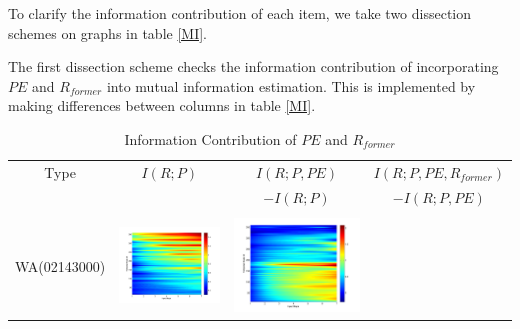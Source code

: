 \documentclass[11pt]{article}
\begin{document}
To clarify the information contribution of each item, 
we take two dissection schemes on graphs in table \ref{MI}.%

The first dissection scheme checks the information contribution of incorporating $PE$ and $R_{former}$ into mutual information estimation. This is implemented by making differences between columns in table \ref{MI}.
\begin{table}[H]\small
\caption{Information Contribution of $PE$ and $R_{former}$}
\label{PER}
\resizebox{\textwidth}{!}
{
\centering
\begin{tabular}{cccc}
\toprule
Type&$I(R;P)$&$I(R;P,PE) $&$I(R;P,PE,R_{former}) $\\
 & &$ -I(R;P)$&$ -I(R;P,PE)$\\\hline
\\
WA(02143000)
&\begin{minipage}{.3\textwidth}\includegraphics[width=\linewidth]{resultgraph/02143000p.png}\end{minipage}
&\begin{minipage}{.3\textwidth}\includegraphics[width=\linewidth]{resultgraph/02143000diff_ep.png}\end{minipage}

\end{tabular}}
\end{table}
\end{document}
